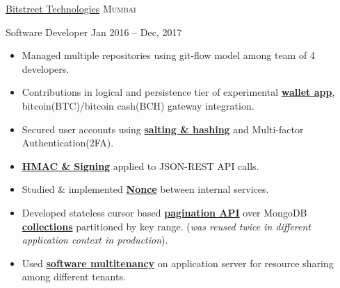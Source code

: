 \documentclass[11pt,a4paper]{article}
\begin{document}



\headedsection
  {\href{http://bitstreet.in/}{Bitstreet Technologies}}
  {\textsc{Mumbai}}
  {%
    \headedsubsection
    {Software Developer}
    {Jan 2016 -- Dec, 2017}
    {
      \begin{itemize}
        \item Managed multiple repositories using git-flow model among team of 4 developers.
        \item Contributions in logical and persistence tier of experimental \href{https://rihbyne.github.io/diy/digital-wallet/}{\textbf{wallet app}}, bitcoin(BTC)/bitcoin cash(BCH) gateway integration.
        \item Secured user accounts using \href{https://rihbyne.github.io/blog/user-auth/}{\textbf{salting \& hashing}} and Multi-factor Authentication(2FA).
        \item \href{https://rihbyne.github.io/blog/hmac-authentication/}{\textbf{HMAC \& Signing}} applied to JSON-REST API calls.
        \item Studied \& implemented \href{https://rihbyne.github.io/diy/nonce-auth-systems/}{\textbf{Nonce}} between internal services.
        \item Developed stateless cursor based \href{https://rihbyne.github.io/diy/stateless-pagination/}{\textbf{pagination API}} over MongoDB \href{https://rihbyne.github.io/diy/notification-core/}{\textbf{collections}} partitioned by key range. (\textit{was reused twice in different application context in production}).
        \item Used \href{https://rihbyne.github.io/diy/multi-tenancy/}{\textbf{software multitenancy}} on application server for resource sharing among different tenants.
      \end{itemize}
    }
  }
\end{document}
